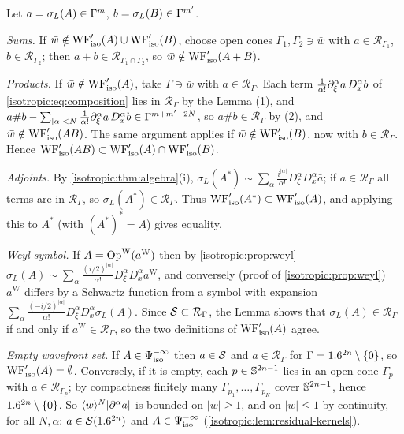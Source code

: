 Let $a=\sigma_L(A)\in\Gamma^{m}$, $b=\sigma_L(B)\in\Gamma^{m'}$.

\emph{Sums.} If $\bar w\notin\operatorname{WF}'_{\mathrm{iso}}(A)\cup\operatorname{WF}'_{\mathrm{iso}}(B)$, choose open
cones $\Gamma_1,\Gamma_2\ni\bar w$ with $a\in\mathcal R_{\Gamma_1}$, $b\in\mathcal R_{\Gamma_2}$;
then $a+b\in\mathcal R_{\Gamma_1\cap\Gamma_2}$, so $\bar w\notin\operatorname{WF}'_{\mathrm{iso}}(A+B)$.

\emph{Products.} If $\bar w\notin\operatorname{WF}'_{\mathrm{iso}}(A)$, take $\Gamma\ni\bar w$ with
$a\in\mathcal R_\Gamma$. Each term $\frac1{\alpha!}\partial_\xi^\alpha a\,D_x^\alpha b$ of
\eqref{isotropic:eq:composition} lies in $\mathcal R_\Gamma$ by the Lemma (1), and
$a\#b-\sum_{|\alpha|<N}\frac1{\alpha!}\partial_\xi^\alpha a\,D_x^\alpha b\in\Gamma^{m+m'-2N}$, so
$a\#b\in\mathcal R_\Gamma$ by (2), and $\bar w\notin\operatorname{WF}'_{\mathrm{iso}}(AB)$. The same
argument applies if $\bar w\notin\operatorname{WF}'_{\mathrm{iso}}(B)$, now with $b\in\mathcal R_\Gamma$.
Hence $\operatorname{WF}'_{\mathrm{iso}}(AB)\subset\operatorname{WF}'_{\mathrm{iso}}(A)\cap\operatorname{WF}'_{\mathrm{iso}}(B)$.

\emph{Adjoints.} By \cref{isotropic:thm:algebra}(i),
$\sigma_L(A^*)\sim\sum_\alpha\frac{i^{|\alpha|}}{\alpha!}D_\xi^\alpha D_x^\alpha\bar a$; if
$a\in\mathcal R_\Gamma$ all terms are in $\mathcal R_\Gamma$, so $\sigma_L(A^*)\in\mathcal R_\Gamma$.
Thus $\operatorname{WF}'_{\mathrm{iso}}(A^*)\subset\operatorname{WF}'_{\mathrm{iso}}(A)$, and applying this to $A^*$
(with $(A^*)^*=A$) gives equality.

\emph{Weyl symbol.} If $A=\operatorname{Op}^{\mathrm{W}}(a^{\mathrm W})$ then by \cref{isotropic:prop:weyl}
$\sigma_L(A)\sim\sum_\alpha\frac{(i/2)^{|\alpha|}}{\alpha!}D_\xi^\alpha D_x^\alpha a^{\mathrm W}$,
and conversely (proof of \cref{isotropic:prop:weyl}) $a^{\mathrm W}$ differs by a
Schwartz function from a symbol with expansion
$\sum_\alpha\frac{(-i/2)^{|\alpha|}}{\alpha!}D_\xi^\alpha D_x^\alpha\sigma_L(A)$. Since
$\mathcal{S}\subset\mathcal R_\Gamma$, the Lemma shows that $\sigma_L(A)\in\mathcal R_\Gamma$ if and
only if $a^{\mathrm W}\in\mathcal R_\Gamma$, so the two definitions of
$\operatorname{WF}'_{\mathrm{iso}}(A)$ agree.

\emph{Empty wavefront set.} If $A\in\Psi^{-\infty}_{\mathrm{iso}}$ then $a\in\mathcal{S}$ and
$a\in\mathcal R_\Gamma$ for $\Gamma=1.6^{2n}\setminus\{0\}$, so $\operatorname{WF}'_{\mathrm{iso}}(A)=\emptyset$.
Conversely, if it is empty, each $p\in\mathbb{S}^{2n-1}$ lies in an open cone
$\Gamma_p$ with $a\in\mathcal R_{\Gamma_p}$; by compactness finitely many
$\Gamma_{p_1},\dots,\Gamma_{p_K}$ cover $\mathbb{S}^{2n-1}$, hence $1.6^{2n}\setminus\{0\}$.
So $\langle w\rangle^N|\partial^\alpha a|$ is bounded on $|w|\ge1$, and on $|w|\le1$ by
continuity, for all $N,\alpha$: $a\in\mathcal{S}(1.6^{2n})$ and $A\in\Psi^{-\infty}_{\mathrm{iso}}$
(\cref{isotropic:lem:residual-kernels}).

